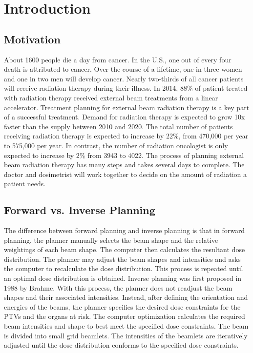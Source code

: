 \chapter{Introduction} \label{chap1}

\section{Motivation}
About 1600 people die a day from cancer. In the U.S., one out of every four death is attributed to cancer. Over the course of a lifetime, one in three women and one in two men will develop cancer. Nearly two-thirds of all cancer patients will receive radiation therapy during their illness. In 2014, 88\% of patient treated with radiation therapy received external beam treatments from a linear accelerator. Treatment planning for external beam radiation therapy is a key part of a successful treatment. 
Demand for radiation therapy is expected to grow 10x faster than the supply between 2010 and 2020. The total number of patients receiving radiation therapy is expected to increase by 22\%, from 470,000 per year to 575,000 per year. In contrast, the number of radiation oncologist is only expected to increase by 2\% from 3943 to 4022. 
The process of planning external beam radiation therapy has many steps and takes several days to complete. The doctor and dosimetrist will work together to decide on the amount of radiation a patient needs. 

\section{Forward vs. Inverse Planning}
The difference between forward planning and inverse planning is that in forward planning, the planner manually selects the beam shape and the relative weightings of each beam shape. The computer then calculates the resultant dose distribution. The planner may adjust the beam shapes and intensities and asks the computer to recalculate the dose distribution. This process is repeated until an optimal dose distribution is obtained. Inverse planning was first proposed in 1988 by Brahme. With this process, the planner does not readjust the beam shapes and their associated intensities. Instead, after defining the orientation and energies of the beams, the planner specifies the desired dose constraints for the PTVs and the organs at risk. The computer optimization calculates the required beam intensities and shape to best meet the specified dose constraints. The beam is divided into small grid beamlets. The intensities of the beamlets are iteratively adjusted until the dose distribution conforms to the specified dose constraints.


